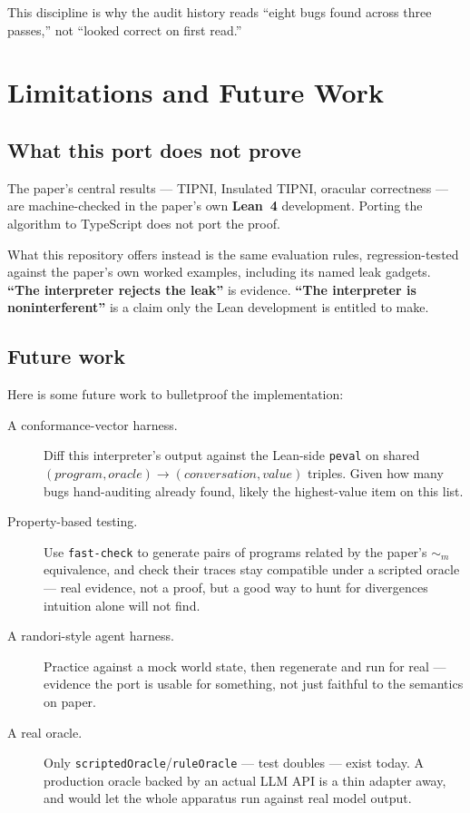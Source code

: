 \documentclass[11pt, a4paper]{article}
\begin{document}
This discipline is why the audit history reads ``eight bugs found across
three passes,'' not ``looked correct on first read.''

\section{Limitations and Future Work}
\label{sec:limits}

\subsection{What this port does not prove}

The paper's central results --- TIPNI, Insulated TIPNI, oracular correctness
--- are machine-checked in the paper's own \textbf{Lean~4} development. Porting
the algorithm to TypeScript does not port the proof. 

What this repository offers instead is the same evaluation rules,
regression-tested against the paper's own worked examples, including its named
leak gadgets.  \textbf{``The interpreter rejects the leak''} is evidence.
\textbf{``The interpreter is noninterferent''} is a claim only the Lean
development is entitled to make.

\subsection{Future work}

Here is some future work to bulletproof the implementation:

\begin{description}
  \item[A conformance-vector harness.] Diff this interpreter's output
    against the Lean-side \texttt{peval} on shared $(\mathit{program},
    \mathit{oracle}) \to (\mathit{conversation}, \mathit{value})$ triples.
    Given how many bugs hand-auditing already found, likely the
    highest-value item on this list.

  \item[Property-based testing.] Use \texttt{fast-check} to generate
    pairs of programs related by the paper's $\sim_m$ equivalence, and
    check their traces stay compatible under a scripted oracle --- real
    evidence, not a proof, but a good way to hunt for divergences
    intuition alone will not find.

  \item[A randori-style agent harness.] Practice against a mock world
    state, then regenerate and run for real --- evidence the port is
    usable for something, not just faithful to the semantics on paper.

  \item[A real oracle.] Only \lstinline{scriptedOracle}/\lstinline{ruleOracle}
    --- test doubles --- exist today. A production oracle backed by an
    actual LLM API is a thin adapter away, and would let the whole
    apparatus run against real model output.
\end{description}
\end{document}
